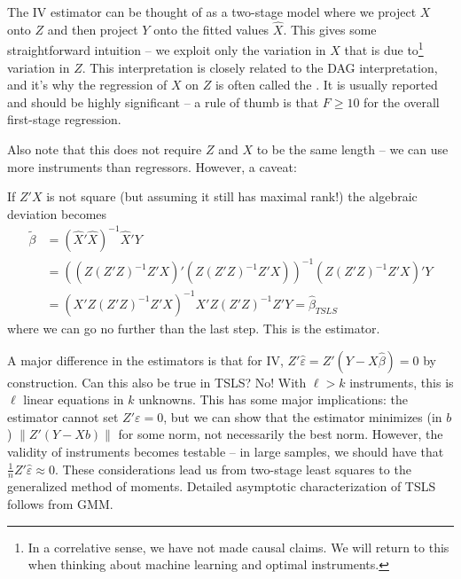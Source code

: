 \documentclass[10pt]{article}
\begin{document}
\begin{remark}
	The IV estimator can be thought of as a two-stage model where we project $X$ onto $Z$ and then project $Y$ onto the fitted values $\hat{X}$. This gives some straightforward intuition -- we exploit only the variation in $X$ that is due to\footnote{In a correlative sense, we have not made causal claims. We will return to this when thinking about machine learning and optimal instruments.} variation in $Z$. This interpretation is closely related to the DAG interpretation, and it's why the regression of $X$ on $Z$ is often called the . It is usually reported and should be highly significant -- a rule of thumb is that $F \ge 10$ for the overall first-stage regression.
	
	Also note that this does not require $Z$ and $X$ to be the same length -- we can use more instruments than regressors. However, a caveat:
\end{remark}

\begin{definition}
	If $Z'X$ is not square (but assuming it still has maximal rank!) the algebraic deviation becomes 
	\begin{align*}
		\tilde{\beta} &= (\hat{X}'\hat{X})^{-1}\hat{X}'Y \\ &= ((Z(Z'Z)^{-1}Z'X)'(Z(Z'Z)^{-1}Z'X))^{-1}(Z(Z'Z)^{-1}Z'X)'Y \\&= (X'Z(Z'Z)^{-1}Z'X)^{-1}X'Z(Z'Z)^{-1}Z'Y = \hat{\beta}_{TSLS}
	\end{align*}
	where we can go no further than the last step. This is the  estimator. 
\end{definition}

\begin{remark}
	A major difference in the estimators is that for IV, $Z'\hat{\varepsilon} = Z'(Y-X\hat{\beta}) = 0$ by construction. Can this also be true in TSLS? No! With $\ell > k$ instruments, this is $\ell$ linear equations in $k$ unknowns. This has some major implications: the estimator cannot set $Z' \varepsilon = 0$, but we can show that the estimator minimizes (in $b$) $\|Z'(Y-Xb)\|$ for some norm, not necessarily the best norm. However, the validity of instruments becomes testable -- in large samples, we should have that $\frac{1}{n}Z'\hat{\varepsilon} \approx 0$. These considerations lead us from two-stage least squares to the generalized method of moments. Detailed asymptotic characterization of TSLS follows from GMM. 
\end{remark}
\end{document}
